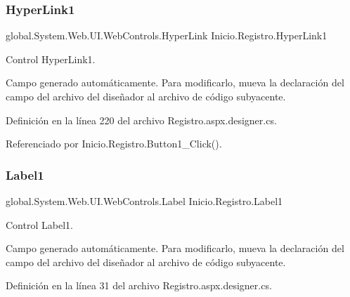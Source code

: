 \mbox{\label{classInicio_1_1Registro_aa4f71bea88748ad5dfc036a400cb4537}} 
\subsubsection{\texorpdfstring{HyperLink1}{HyperLink1}}
{\footnotesize\ttfamily global.\+System.\+Web.\+U\+I.\+Web\+Controls.\+Hyper\+Link Inicio.\+Registro.\+Hyper\+Link1\hspace{0.3cm}{\ttfamily [protected]}}



Control Hyper\+Link1. 

Campo generado automáticamente. Para modificarlo, mueva la declaración del campo del archivo del diseñador al archivo de código subyacente. 

Definición en la línea 220 del archivo Registro.\+aspx.\+designer.\+cs.



Referenciado por Inicio.\+Registro.\+Button1\+\_\+\+Click().

\mbox{\label{classInicio_1_1Registro_a4ec239a90d4abd7bfd75de6f88d318c9}} 
\subsubsection{\texorpdfstring{Label1}{Label1}}
{\footnotesize\ttfamily global.\+System.\+Web.\+U\+I.\+Web\+Controls.\+Label Inicio.\+Registro.\+Label1\hspace{0.3cm}{\ttfamily [protected]}}



Control Label1. 

Campo generado automáticamente. Para modificarlo, mueva la declaración del campo del archivo del diseñador al archivo de código subyacente. 

Definición en la línea 31 del archivo Registro.\+aspx.\+designer.\+cs.

\mbox{\label{classInicio_1_1Registro_ae7b4e658b3d377fe9acc4b4930616dae}} 
